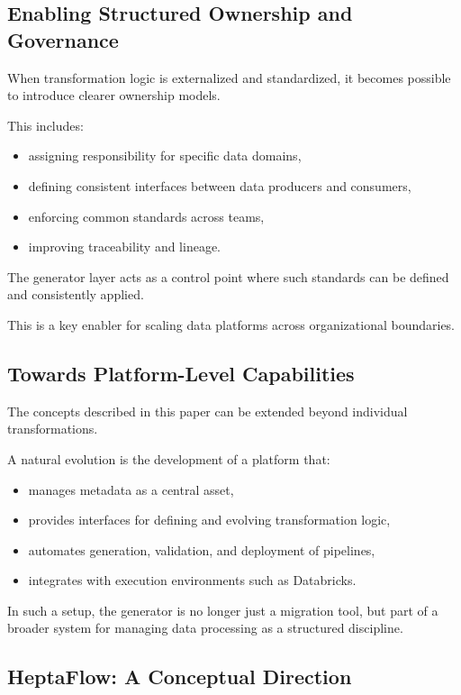 \documentclass[11pt,a4paper]{article}
\begin{document}
\subsection{Enabling Structured Ownership and Governance}

When transformation logic is externalized and standardized, it becomes possible to introduce clearer ownership models.

This includes:
\begin{itemize}
  \item assigning responsibility for specific data domains,
  \item defining consistent interfaces between data producers and consumers,
  \item enforcing common standards across teams,
  \item improving traceability and lineage.
\end{itemize}

The generator layer acts as a control point where such standards can be defined and consistently applied.

This is a key enabler for scaling data platforms across organizational boundaries.

\subsection{Towards Platform-Level Capabilities}

The concepts described in this paper can be extended beyond individual transformations.

A natural evolution is the development of a platform that:
\begin{itemize}
  \item manages metadata as a central asset,
  \item provides interfaces for defining and evolving transformation logic,
  \item automates generation, validation, and deployment of pipelines,
  \item integrates with execution environments such as Databricks.
\end{itemize}

In such a setup, the generator is no longer just a migration tool, but part of a broader system for managing data processing as a structured discipline.

\subsection{HeptaFlow: A Conceptual Direction}
\end{document}
